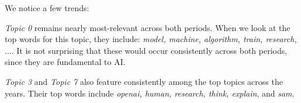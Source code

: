 We notice a few trends:
\begin{enumroman}
  \item \emph{Topic 0} remains nearly most-relevant across both periods.
    When we look at the top words for this topic, they include:
    \emph{model, machine, algorithm, train, research, $\ldots$}.
    It is not surprising that these would occur consistently
    across both periods, since they are fundamental to AI.
  \item \emph{Topic 3} and \emph{Topic 7} also feature consistently among the top topics
    across the years. Their top words include \emph{openai, human, research, think, explain}, and \emph{sam}.
\end{enumroman}
